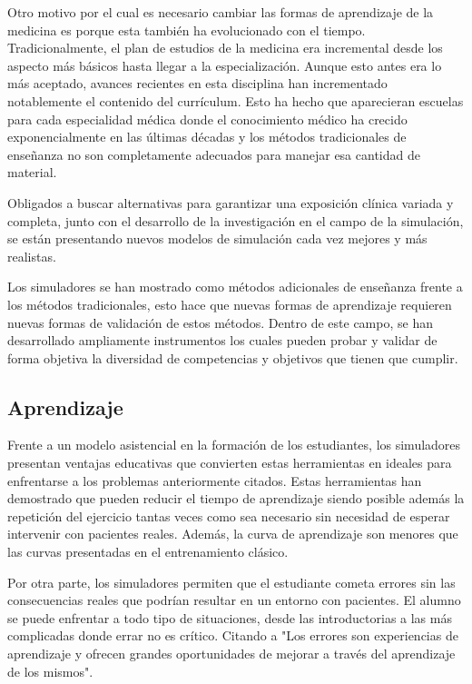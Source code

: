 Otro motivo por el cual es necesario cambiar las formas de aprendizaje de la medicina es porque esta también ha evolucionado con el tiempo.
Tradicionalmente, el plan de estudios de la medicina era incremental desde los aspecto más básicos hasta llegar a la especialización. Aunque esto antes era lo más aceptado, avances recientes en esta disciplina han incrementado notablemente el contenido del currículum. Esto ha hecho que aparecieran escuelas para cada especialidad médica donde el conocimiento médico ha crecido exponencialmente en las últimas décadas y los métodos tradicionales de enseñanza no son completamente adecuados para manejar esa cantidad de material.

Obligados a buscar alternativas para garantizar una exposición clínica variada y completa, junto con el desarrollo de la investigación en el campo de la simulación, se están presentando nuevos modelos de simulación cada vez mejores y más realistas.

Los simuladores se han mostrado como métodos adicionales de enseñanza frente a los métodos tradicionales, esto hace que nuevas formas de aprendizaje requieren nuevas formas de validación de estos métodos. Dentro de este campo, se han desarrollado ampliamente instrumentos los cuales pueden probar y validar de forma objetiva la diversidad de competencias y objetivos que tienen que cumplir.


\subsection{Aprendizaje}

Frente a un modelo asistencial en la formación de los estudiantes, los simuladores presentan  ventajas educativas que convierten estas herramientas en ideales para enfrentarse a los problemas anteriormente citados. Estas herramientas han demostrado que pueden reducir el tiempo de aprendizaje\cite{} siendo posible además la repetición del ejercicio tantas veces como sea necesario sin necesidad de esperar intervenir con pacientes reales. Además, la curva de aprendizaje son menores que las curvas presentadas en el entrenamiento clásico.

Por otra parte, los simuladores permiten que el estudiante cometa errores sin las consecuencias reales que podrían resultar en un entorno con pacientes. El alumno se puede enfrentar a todo tipo de situaciones, desde las introductorias a las más complicadas donde errar no es crítico. Citando a \cite{ziv2008educacion} "Los errores son experiencias de aprendizaje y ofrecen grandes oportunidades de mejorar a través del aprendizaje de los mismos". 

